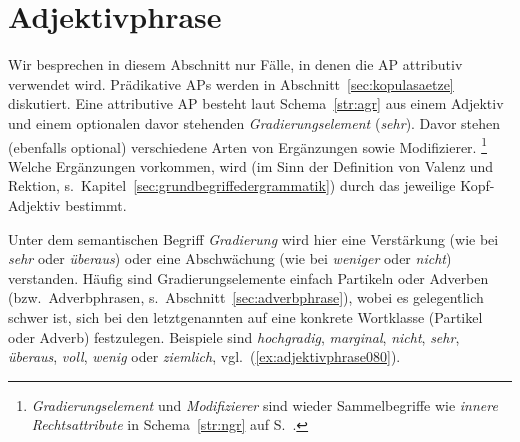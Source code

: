 \section{Adjektivphrase}
\label{sec:adjektivphrase}

Wir besprechen in diesem Abschnitt nur Fälle, in denen die AP attributiv verwendet wird.
Prädikative APs werden in Abschnitt~\ref{sec:kopulasaetze} diskutiert.
Eine attributive AP besteht laut Schema~\ref{str:agr} aus einem Adjektiv und einem optionalen davor stehenden \textit{Gradierungselement} (\zB \textit{sehr}).
Davor stehen (ebenfalls optional) verschiedene Arten von Ergänzungen sowie Modifizierer.%
\footnote{\textit{Gradierungselement} und \textit{Modifizierer} sind wieder Sammelbegriffe wie \textit{innere Rechtsattribute} in Schema~\ref{str:ngr} auf S.~\pageref{str:ngr}.}
Welche Ergänzungen vorkommen, wird (im Sinn der Definition von Valenz und Rektion, s.\ Kapitel~\ref{sec:grundbegriffedergrammatik}) durch das jeweilige Kopf-Adjektiv bestimmt.



Unter dem semantischen Begriff \textit{Gradierung} wird hier eine Verstärkung (wie bei \textit{sehr} oder \textit{überaus}) oder eine Abschwächung (wie bei \textit{weniger} oder \textit{nicht}) verstanden.
Häufig sind Gradierungselemente einfach Partikeln oder Adverben (bzw.\ Adverbphrasen, s.\ Abschnitt~\ref{sec:adverbphrase}), wobei es gelegentlich schwer ist, sich bei den letztgenannten auf eine konkrete Wortklasse (Partikel oder Adverb) festzulegen.
Beispiele sind \textit{hochgradig}, \textit{marginal}, \textit{nicht}, \textit{sehr}, \textit{überaus}, \textit{voll}, \textit{wenig} oder \textit{ziemlich}, vgl.\ (\ref{ex:adjektivphrase080}).

\begin{exe}
  \ex\label{ex:adjektivphrase080}
  \begin{xlist}
  \end{xlist}
\end{exe}


